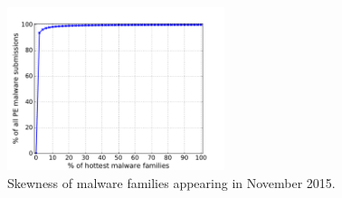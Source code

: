 \begin{figure}[t!]
\begin{center}
\includegraphics[width=2.5in]{figure/cum}
\caption{Skewness of malware families appearing in November 2015.}
\label{fig:acum}
\end{center}
\end{figure}